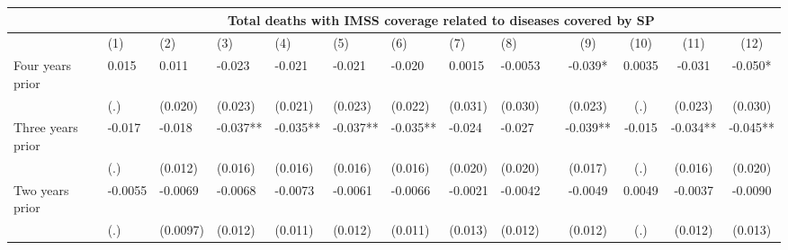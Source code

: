 \begin{tabular}{lccccrrrrrcccc}
\toprule
      & \multicolumn{13}{c}{Total deaths with IMSS coverage related to diseases covered by SP} \\
\midrule
      & \multicolumn{1}{l}{(1)} & \multicolumn{1}{l}{(2)} & \multicolumn{1}{l}{(3)} & \multicolumn{1}{l}{(4)} & \multicolumn{1}{l}{(5)} & \multicolumn{1}{l}{(6)} & \multicolumn{1}{l}{(7)} & \multicolumn{1}{l}{(8)} &       & (9)   & (10)  & (11)  & (12) \\
\midrule
\midrule
Four years prior & \multicolumn{1}{l}{0.015} & \multicolumn{1}{l}{0.011} & \multicolumn{1}{l}{-0.023} & \multicolumn{1}{l}{-0.021} & \multicolumn{1}{l}{-0.021} & \multicolumn{1}{l}{-0.020} & \multicolumn{1}{l}{0.0015} & \multicolumn{1}{l}{-0.0053} &       & -0.039* & 0.0035 & -0.031 & -0.050* \\
      & \multicolumn{1}{l}{(.)} & \multicolumn{1}{l}{(0.020)} & \multicolumn{1}{l}{(0.023)} & \multicolumn{1}{l}{(0.021)} & \multicolumn{1}{l}{(0.023)} & \multicolumn{1}{l}{(0.022)} & \multicolumn{1}{l}{(0.031)} & \multicolumn{1}{l}{(0.030)} &       & (0.023) & (.)   & (0.023) & (0.030) \\
Three years prior & \multicolumn{1}{l}{-0.017} & \multicolumn{1}{l}{-0.018} & \multicolumn{1}{l}{-0.037**} & \multicolumn{1}{l}{-0.035**} & \multicolumn{1}{l}{-0.037**} & \multicolumn{1}{l}{-0.035**} & \multicolumn{1}{l}{-0.024} & \multicolumn{1}{l}{-0.027} &       & -0.039** & -0.015 & -0.034** & -0.045** \\
      & \multicolumn{1}{l}{(.)} & \multicolumn{1}{l}{(0.012)} & \multicolumn{1}{l}{(0.016)} & \multicolumn{1}{l}{(0.016)} & \multicolumn{1}{l}{(0.016)} & \multicolumn{1}{l}{(0.016)} & \multicolumn{1}{l}{(0.020)} & \multicolumn{1}{l}{(0.020)} &       & (0.017) & (.)   & (0.016) & (0.020) \\
Two years prior & \multicolumn{1}{l}{-0.0055} & \multicolumn{1}{l}{-0.0069} & \multicolumn{1}{l}{-0.0068} & \multicolumn{1}{l}{-0.0073} & \multicolumn{1}{l}{-0.0061} & \multicolumn{1}{l}{-0.0066} & \multicolumn{1}{l}{-0.0021} & \multicolumn{1}{l}{-0.0042} &       & -0.0049 & 0.0049 & -0.0037 & -0.0090 \\
      & \multicolumn{1}{l}{(.)} & \multicolumn{1}{l}{(0.0097)} & \multicolumn{1}{l}{(0.012)} & \multicolumn{1}{l}{(0.011)} & \multicolumn{1}{l}{(0.012)} & \multicolumn{1}{l}{(0.011)} & \multicolumn{1}{l}{(0.013)} & \multicolumn{1}{l}{(0.012)} &       & (0.012) & (.)   & (0.012) & (0.013) \\

\end{tabular}

